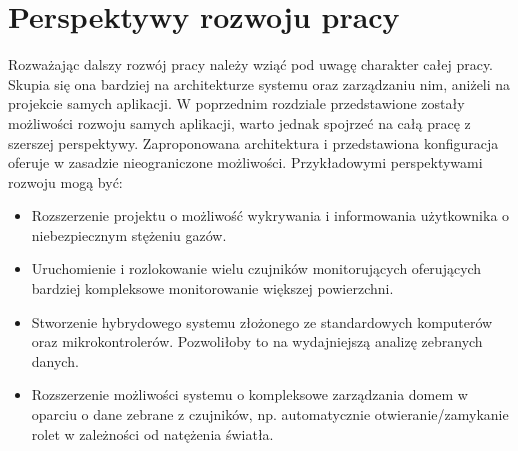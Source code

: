 \documentclass[12pt]{report}
\let\Oldsection\section
\renewcommand{\section}{\FloatBarrier\Oldsection}
\begin{document}
{\section{Perspektywy rozwoju pracy}
Rozważając dalszy rozwój pracy należy wziąć pod uwagę charakter całej pracy. Skupia się ona bardziej na architekturze systemu oraz zarządzaniu nim, aniżeli na projekcie samych aplikacji. W poprzednim rozdziale przedstawione zostały możliwości rozwoju samych aplikacji, warto jednak spojrzeć na całą pracę z szerszej perspektywy. Zaproponowana architektura i przedstawiona konfiguracja oferuje w zasadzie nieograniczone możliwości. Przykładowymi perspektywami rozwoju mogą być:
\begin{itemize}
\item{Rozszerzenie projektu o możliwość wykrywania i informowania użytkownika o niebezpiecznym stężeniu gazów.}
\item{Uruchomienie i rozlokowanie wielu czujników monitorujących oferujących bardziej kompleksowe monitorowanie większej powierzchni.}
\item{Stworzenie hybrydowego systemu złożonego ze standardowych komputerów oraz mikrokontrolerów. Pozwoliłoby to na wydajniejszą analizę zebranych danych.}
\item{Rozszerzenie możliwości systemu o kompleksowe zarządzania domem w oparciu o dane zebrane z czujników, np. automatycznie otwieranie/zamykanie rolet w zależności od natężenia światła.}
\end{itemize}


}
\end{document}
